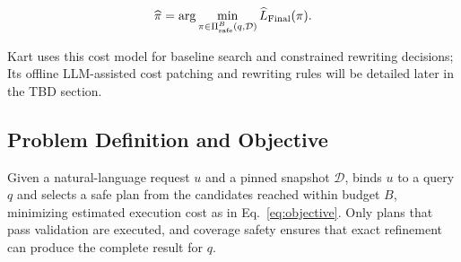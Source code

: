 \begin{equation}\label{eq:objective}
\widehat{\pi}=
\arg\min_{\pi\in\Pi_{\mathrm{safe}}^{B}(q,\mathcal{D})}
\widehat{L}_{\mathrm{Final}}(\pi).
\end{equation}

Kart uses this cost model for baseline search and constrained rewriting decisions;
Its offline LLM-assisted cost patching and rewriting rules will be detailed later in the TBD section.

\subsection{Problem Definition and Objective}\label{sec:workflow}

Given a natural-language request $u$ and a pinned snapshot $\mathcal{D}$, \KART{} binds $u$ to a query $q$ and selects a safe plan from the candidates reached within budget $B$, minimizing estimated execution cost as in Eq.~\eqref{eq:objective}. Only plans that pass validation are executed, and coverage safety ensures that exact refinement can produce the complete result for $q$.


